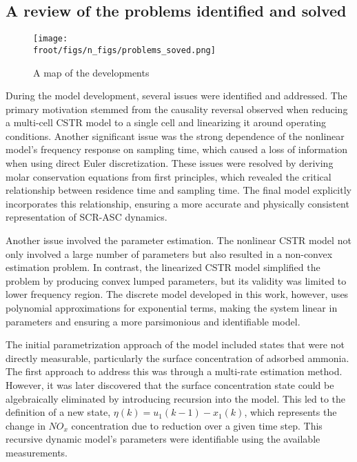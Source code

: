 \subsection{A review of the problems identified and solved}

\begin{figure}[H]
        \centering
        \texttt{[image: \\froot/figs/n\_figs/problems\_soved.png]}
        \caption{A map of the developments}
\end{figure}

During the model development, several issues were identified and addressed. The primary motivation stemmed from the
causality reversal observed when reducing a multi-cell CSTR model to a single cell and linearizing it around operating
conditions. Another significant issue was the strong dependence of the nonlinear model's frequency response on sampling
time, which caused a loss of information when using direct Euler discretization. These issues were resolved by deriving
molar conservation equations from first principles, which revealed the critical relationship between residence time and
sampling time. The final model explicitly incorporates this relationship, ensuring a more accurate and physically
consistent representation of SCR-ASC dynamics.

Another issue involved the parameter estimation. The nonlinear CSTR model not only involved a large number of parameters
but also resulted in a non-convex estimation problem. In contrast, the linearized CSTR model simplified the problem by
producing convex lumped parameters, but its validity was limited to lower frequency region. The discrete model developed
in this work, however, uses polynomial approximations for exponential terms, making the system linear in parameters and
ensuring a more parsimonious and identifiable model.

The initial parametrization approach of the model included states that were not directly measurable, particularly the
surface concentration of adsorbed ammonia. The first approach to address this was through a multi-rate estimation
method. However, it was later discovered that the surface concentration state could be algebraically eliminated by
introducing recursion into the model. This led to the definition of a new state, $\eta(k) = u_1(k-1) - x_1(k)$, which
represents the change in $NO_x$ concentration due to reduction over a given time step. This recursive dynamic model's
parameters were identifiable using the available measurements.

